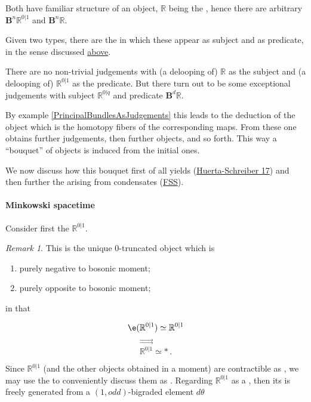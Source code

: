 \documentclass[12pt,titlepage]{article}
\theoremstyle{plain}
\theoremstyle{definition}
\theoremstyle{remark}
\newtheorem{remark}{Remark}
\begin{document}
Both have familiar structure of an  object, $\mathbb{R}$ being the , hence there are arbitrary  $\mathbf{B}^n \mathbb{R}^{0|1}$ and $\mathbf{B}^{n}\mathbb{R}$.

Given two types, there are the  in which these appear as subject and as predicate, in the sense discussed \hyperlink{JudgementInFormalization}{above}.

There are no non-trivial judgements with (a delooping of) $\mathbb{R}$ as the subject and (a delooping of) $\mathbb{R}^{0|1}$ as the predicate. But there turn out to be some exceptional judgements with subject $\mathbb{R}^{0|q}$ and predicate $\mathbf{B}^d \mathbb{R}$.

By example \ref{PrincipalBundlesAsJudgements} this leads to the deduction of the object which is the homotopy fibers of the corresponding maps. From these one obtains further judgements, then further objects, and so forth. This way a ``bouquet'' of objects is induced from the initial ones.

We now discuss how this bouquet first of all yields  (\hyperlink{HuertaSchreiber17}{Huerta-Schreiber 17}) and then further the  arising from  condensates (\hyperlink{FSS}{FSS}).

\hypertarget{minkowski_spacetime}{}\paragraph*{{Minkowski spacetime}}\label{minkowski_spacetime}

Consider first the  $\mathbb{R}^{0|1}$.

\begin{remark}
\label{}\hypertarget{}{}
This is the unique 0-truncated object which is

\begin{enumerate}%
\item purely negative to bosonic moment;


\item purely opposite to bosonic moment;



\end{enumerate}
in that

\begin{displaymath}
\e(\mathbb{R}^{0|1})\simeq \mathbb{R}^{0|1}
\end{displaymath}
\begin{displaymath}
\stackrel{\rightrightarrows}{\mathbb{R}^{0|1}} \simeq \ast
  \,.
\end{displaymath}
\end{remark}
Since $\mathbb{R}^{0|1}$ (and the other objects obtained in a moment) are contractible as , we may use the  to conveniently discuss them as . Regarding $\mathbb{R}^{0\vert 1}$ as a , then its  is freely generated from a $(1,odd)$-bigraded element $d\theta$
\end{document}
